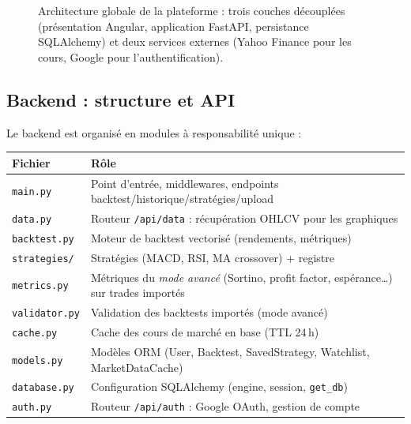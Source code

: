 \documentclass[11pt,a4paper]{article}
\newcommand{\code}[1]{\texttt{#1}}
\begin{document}
\begin{figure}[H]
{}
\caption{Architecture globale de la plateforme : trois couches découplées
(présentation Angular, application FastAPI, persistance SQLAlchemy) et deux
services externes (Yahoo Finance pour les cours, Google pour l'authentification).}
\label{fig:archi}
\end{figure}

\subsection{Backend : structure et API}
Le backend est organisé en modules à responsabilité unique :
\begin{center}
\begin{tabular}{@{}l p{10.8cm}@{}}
\toprule
\textbf{Fichier} & \textbf{Rôle} \\
\midrule
\code{main.py}        & Point d'entrée, middlewares, endpoints backtest/historique/stratégies/upload \\
\code{data.py}        & Routeur \code{/api/data} : récupération OHLCV pour les graphiques \\
\code{backtest.py}    & Moteur de backtest vectorisé (rendements, métriques) \\
\code{strategies/}    & Stratégies (MACD, RSI, MA crossover) + registre \\
\code{metrics.py}     & Métriques du \emph{mode avancé} (Sortino, profit factor, espérance\dots) sur trades importés \\
\code{validator.py}   & Validation des backtests importés (mode avancé) \\
\code{cache.py}       & Cache des cours de marché en base (TTL 24\,h) \\
\code{models.py}      & Modèles ORM (User, Backtest, SavedStrategy, Watchlist, MarketDataCache) \\
\code{database.py}    & Configuration SQLAlchemy (engine, session, \code{get\_db}) \\
\code{auth.py}        & Routeur \code{/api/auth} : Google OAuth, gestion de compte \\
\bottomrule
\end{tabular}
\end{center}
\end{document}

